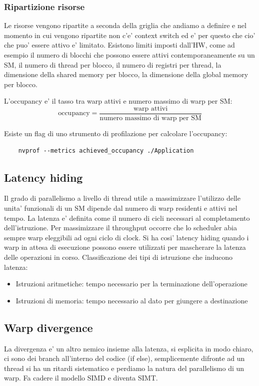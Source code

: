 \subsubsection{Ripartizione risorse}
Le risorse vengono ripartite a seconda della griglia che andiamo a definire e nel momento in cui vengono ripartite non c'e' context switch ed e' per questo che cio' che puo' essere attivo e' limitato.
Esistono limiti imposti dall'HW, come ad esempio il numero di blocchi che possono essere attivi contemporaneamente su un SM, il numero di thread per blocco, il numero di registri per thread, la dimensione della shared memory per blocco, la dimensione della global memory per blocco. 

L'occupancy e' il tasso tra warp attivi e numero massimo di warp per SM:
\[
\text{occupancy} = \frac{\text{warp attivi}}{\text{numero massimo di warp per SM}}
\]

Esiste un flag di uno strumento di profilazione per calcolare l'occupancy:
\begin{lstlisting}
    nvprof --metrics achieved_occupancy ./Application
\end{lstlisting}

\subsection{Latency hiding}
Il grado di parallelismo a livello di thread utile a massimizzare l'utilizzo delle unita' funzionali di un SM dipende dal numero di warp residenti e attivi nel tempo. 
La latenza e' definita come il numero di cicli necessari al completamento dell'istruzione. Per massimizzare il throughput occorre che lo scheduler abia sempre warp eleggibili ad ogni ciclo di clock. Si ha cosi' latency hiding quando i warp in attesa di esecuzione possono essere utilizzati per mascherare la latenza delle operazioni in corso.
Classificazione dei tipi di istruzione che inducono latenza:
\begin{itemize}
    \item Istruzioni aritmetiche: tempo necessario per la terminazione dell'operazione
    \item Istruzioni di memoria: tempo necessario al dato per giungere a destinazione
\end{itemize}

\subsection{Warp divergence}
La divergenza e' un altro nemico insieme alla latenza, si esplicita in modo chiaro, ci sono dei branch all'interno del codice (if else), semplicemente difronte ad un thread si ha un ritardi sistematico e perdiamo la natura del parallelismo di un warp. Fa cadere il modello SIMD e diventa SIMT.

